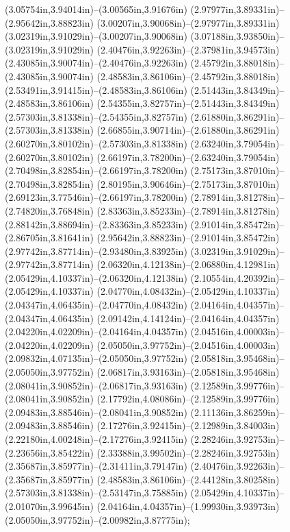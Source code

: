 (3.05754in,3.94014in)--(3.00565in,3.91676in) (2.97977in,3.89331in)--(2.95642in,3.88823in) (3.00207in,3.90068in)--(2.97977in,3.89331in) (3.02319in,3.91029in)--(3.00207in,3.90068in) (3.07188in,3.93850in)--(3.02319in,3.91029in) (2.40476in,3.92263in)--(2.37981in,3.94573in) (2.43085in,3.90074in)--(2.40476in,3.92263in) (2.45792in,3.88018in)--(2.43085in,3.90074in) (2.48583in,3.86106in)--(2.45792in,3.88018in) (2.53491in,3.91415in)--(2.48583in,3.86106in) (2.51443in,3.84349in)--(2.48583in,3.86106in) (2.54355in,3.82757in)--(2.51443in,3.84349in) (2.57303in,3.81338in)--(2.54355in,3.82757in) (2.61880in,3.86291in)--(2.57303in,3.81338in) (2.66855in,3.90714in)--(2.61880in,3.86291in) (2.60270in,3.80102in)--(2.57303in,3.81338in) (2.63240in,3.79054in)--(2.60270in,3.80102in) (2.66197in,3.78200in)--(2.63240in,3.79054in) (2.70498in,3.82854in)--(2.66197in,3.78200in) (2.75173in,3.87010in)--(2.70498in,3.82854in) (2.80195in,3.90646in)--(2.75173in,3.87010in) (2.69123in,3.77546in)--(2.66197in,3.78200in) (2.78914in,3.81278in)--(2.74820in,3.76848in) (2.83363in,3.85233in)--(2.78914in,3.81278in) (2.88142in,3.88694in)--(2.83363in,3.85233in) (2.91014in,3.85472in)--(2.86705in,3.81641in) (2.95642in,3.88823in)--(2.91014in,3.85472in) (2.97742in,3.87714in)--(2.93480in,3.83925in) (3.02319in,3.91029in)--(2.97742in,3.87714in) (2.06320in,4.12138in)--(2.06880in,4.12981in) (2.05429in,4.10337in)--(2.06320in,4.12138in) (2.10554in,4.20392in)--(2.05429in,4.10337in) (2.04770in,4.08432in)--(2.05429in,4.10337in) (2.04347in,4.06435in)--(2.04770in,4.08432in) (2.04164in,4.04357in)--(2.04347in,4.06435in) (2.09142in,4.14124in)--(2.04164in,4.04357in) (2.04220in,4.02209in)--(2.04164in,4.04357in) (2.04516in,4.00003in)--(2.04220in,4.02209in) (2.05050in,3.97752in)--(2.04516in,4.00003in) (2.09832in,4.07135in)--(2.05050in,3.97752in) (2.05818in,3.95468in)--(2.05050in,3.97752in) (2.06817in,3.93163in)--(2.05818in,3.95468in) (2.08041in,3.90852in)--(2.06817in,3.93163in) (2.12589in,3.99776in)--(2.08041in,3.90852in) (2.17792in,4.08086in)--(2.12589in,3.99776in) (2.09483in,3.88546in)--(2.08041in,3.90852in) (2.11136in,3.86259in)--(2.09483in,3.88546in) (2.17276in,3.92415in)--(2.12989in,3.84003in) (2.22180in,4.00248in)--(2.17276in,3.92415in) (2.28246in,3.92753in)--(2.23656in,3.85422in) (2.33388in,3.99502in)--(2.28246in,3.92753in) (2.35687in,3.85977in)--(2.31411in,3.79147in) (2.40476in,3.92263in)--(2.35687in,3.85977in) (2.48583in,3.86106in)--(2.44128in,3.80258in) (2.57303in,3.81338in)--(2.53147in,3.75885in) (2.05429in,4.10337in)--(2.01070in,3.99645in) (2.04164in,4.04357in)--(1.99930in,3.93973in) (2.05050in,3.97752in)--(2.00982in,3.87775in);
